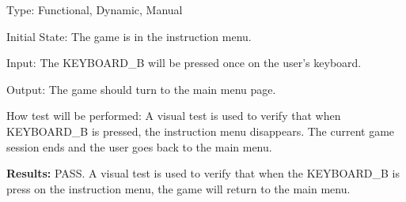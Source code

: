 \documentclass[12pt, titlepage]{article}
\begin{document}
\begin{enumerate}
Type: Functional, Dynamic, Manual
					
Initial State: The game is in the instruction menu.
					
Input: The KEYBOARD\_B will be pressed once on the user's keyboard.
					
Output: The game should turn to the main menu page.
					
How test will be performed: A visual test is used to verify that when KEYBOARD\_B is pressed, the instruction menu disappears. The current game session ends and the user goes back to the main menu.

\textbf{Results: }PASS. A visual test is used to verify that when the KEYBOARD\_B is press on the instruction menu, the game will return to the main menu. 
\end{enumerate}
\end{document}
